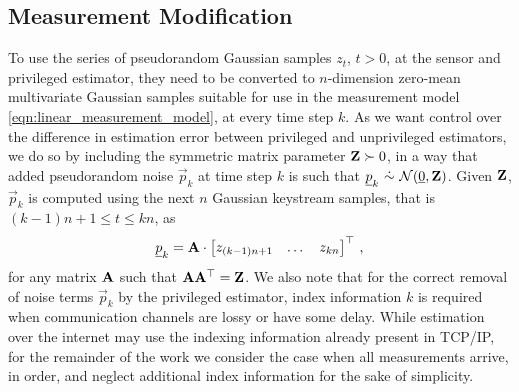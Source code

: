 \subsection{Measurement Modification}\label{subsec:priv_estimation:est_measurement_mod}
To use the series of pseudorandom Gaussian samples $z_t$, $t>0$, at the sensor and privileged estimator, they need to be converted to $n$-dimension zero-mean multivariate Gaussian samples suitable for use in the measurement model \eqref{eqn:linear_measurement_model}, at every time step $k$. As we want control over the difference in estimation error between privileged and unprivileged estimators, we do so by including the symmetric matrix parameter ${{\mathbf{Z}}}\succ 0$, in a way that added pseudorandom noise $\vec{p}_k$ at time step $k$ is such that $\vec{p}_k\ \dot{\sim}\ \mathcal{N}(\vec{0},\mat{Z})$. Given ${{\mathbf{Z}}}$, $\vec{p}_k$ is computed using the next $n$ Gaussian keystream samples, that is $(k-1)n+1\leq t\leq kn$, as
\begin{equation}
   {\underline{p}}_k = {{\mathbf{A}}}\cdot
   \begin{bmatrix}
      z_{(k-1)n+1} & \dots & z_{kn}
   \end{bmatrix}^\top\,,
\end{equation}
for any matrix ${{\mathbf{A}}}$ such that ${{\mathbf{A}}}{{\mathbf{A}}}^\top={{\mathbf{Z}}}$. We also note that for the correct removal of noise terms $\vec{p}_k$ by the privileged estimator, index information $k$ is required when communication channels are lossy or have some delay. While estimation over the internet may use the indexing information already present in TCP/IP, for the remainder of the work we consider the case when all measurements arrive, in order, and neglect additional index information for the sake of simplicity.

